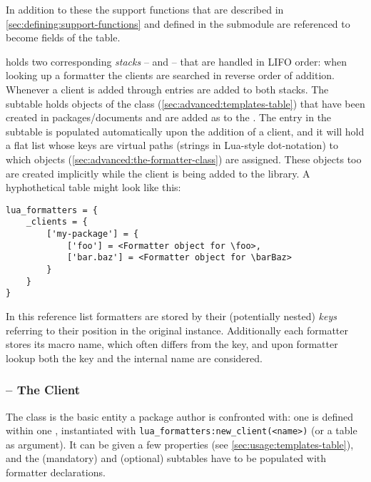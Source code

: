 \documentclass[12pt]{scrartcl}
\begin{document}
\noindent In addition to these the support functions that are described in
\vref{sec:defining:support-functions} and defined in the submodule
 are referenced to become fields of
the  table.

 holds two corresponding \emph{stacks} --
 and  -- that are handled in LIFO order:
when looking up a formatter the clients are searched in reverse order of
addition.  Whenever a client is added through 
entries are added to both stacks.
The  subtable holds objects of the 
class (\vref{sec:advanced:templates-table}) that have been created in
packages/documents and are added as  to the
.  The entry in the  subtable is
populated automatically upon the addition of a client, and it will hold a flat
list whose keys are virtual paths (strings in Lua-style dot-notation) to which
 objects (\vref{sec:advanced:the-formatter-class}) are
assigned.  These  objects too are created implicitly while the
client is being added to the library.  A hyphothetical  table might look like this:

\begin{verbatim}
lua_formatters = {
	_clients = {
		['my-package'] = {
			['foo'] = <Formatter object for \foo>,
			['bar.baz'] = <Formatter object for \barBaz>
		}
	}
}
\end{verbatim}

\noindent In this reference list formatters are stored by their (potentially
nested) \emph{keys} referring to their position in the original
 instance.  Additionally each formatter stores its macro
name, which often differs from the key, and upon formatter lookup both the key
and the internal name are considered.



\subsubsection{ -- The Client}
\label{sec:advanced:templates-table}

The  class is the basic entity a package author is
confronted with: one  is defined within one ,
instantiated with \texttt{lua_formatters:new_client(<name>)} (or a table as
argument).  It can be given a few properties (see
\vref{sec:usage:templates-table}), and the  (mandatory) and
 (optional) subtables have to be populated with formatter
declarations.
\end{document}
